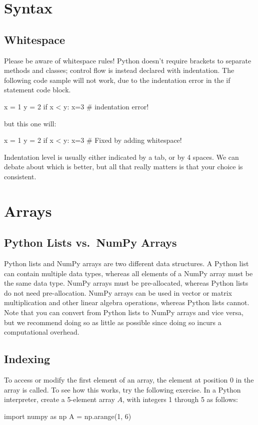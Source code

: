 \documentclass{article}
\begin{document}
\section{Syntax}
\subsection{Whitespace}
Please be aware of whitespace rules! Python doesn't require brackets to separate methods and classes; control flow is instead declared with indentation. The following code sample will not work, due to the indentation error in the if statement code block.
\begin{python}
x = 1
y = 2
if x < y:
x=3 # indentation error!
\end{python}
but this one will:
\begin{python}
x = 1
y = 2
if x < y:
    x=3 # Fixed by adding whitespace!
\end{python}
Indentation level is usually either indicated by a tab, or by 4 spaces. We can debate about which is better, but all that really matters is that your choice is consistent.


\section{Arrays}
\subsection{Python Lists vs.~NumPy Arrays}
Python lists and NumPy arrays are two different data structures. A Python list can contain multiple data types, whereas all elements of a NumPy array must be the same data type. NumPy arrays must be pre-allocated, whereas Python lists do not need pre-allocation. NumPy arrays can be used in vector or matrix multiplication and other linear algebra operations, whereas Python lists cannot. Note that you can convert from Python lists to NumPy arrays and vice versa, but we recommend doing so as little as possible since doing so incurs a computational overhead.

\subsection{Indexing}
To access or modify the first element of an array, the element at position 0 in the array is called. To see how this works, try the following exercise.
In a Python interpreter, create a 5-element array $A$, with integers 1 through 5 as follows:
\begin{python}
import numpy as np
A = np.arange(1, 6)
\end{python}
\end{document}
